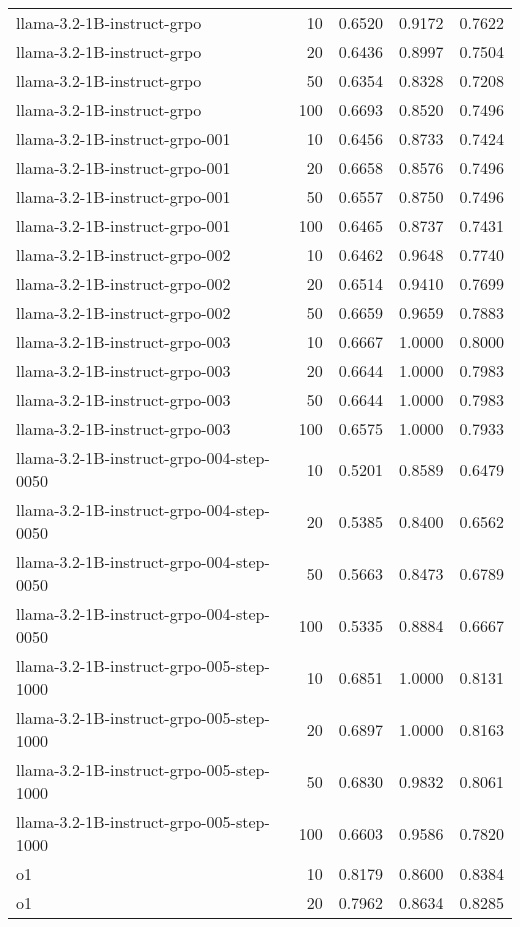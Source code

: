 \begin{tabular}{lrrrr}
llama-3.2-1B-instruct-grpo & 10 & 0.6520 & 0.9172 & 0.7622 \\
llama-3.2-1B-instruct-grpo & 20 & 0.6436 & 0.8997 & 0.7504 \\
llama-3.2-1B-instruct-grpo & 50 & 0.6354 & 0.8328 & 0.7208 \\
llama-3.2-1B-instruct-grpo & 100 & 0.6693 & 0.8520 & 0.7496 \\
llama-3.2-1B-instruct-grpo-001 & 10 & 0.6456 & 0.8733 & 0.7424 \\
llama-3.2-1B-instruct-grpo-001 & 20 & 0.6658 & 0.8576 & 0.7496 \\
llama-3.2-1B-instruct-grpo-001 & 50 & 0.6557 & 0.8750 & 0.7496 \\
llama-3.2-1B-instruct-grpo-001 & 100 & 0.6465 & 0.8737 & 0.7431 \\
llama-3.2-1B-instruct-grpo-002 & 10 & 0.6462 & 0.9648 & 0.7740 \\
llama-3.2-1B-instruct-grpo-002 & 20 & 0.6514 & 0.9410 & 0.7699 \\
llama-3.2-1B-instruct-grpo-002 & 50 & 0.6659 & 0.9659 & 0.7883 \\
llama-3.2-1B-instruct-grpo-003 & 10 & 0.6667 & 1.0000 & 0.8000 \\
llama-3.2-1B-instruct-grpo-003 & 20 & 0.6644 & 1.0000 & 0.7983 \\
llama-3.2-1B-instruct-grpo-003 & 50 & 0.6644 & 1.0000 & 0.7983 \\
llama-3.2-1B-instruct-grpo-003 & 100 & 0.6575 & 1.0000 & 0.7933 \\
llama-3.2-1B-instruct-grpo-004-step-0050 & 10 & 0.5201 & 0.8589 & 0.6479 \\
llama-3.2-1B-instruct-grpo-004-step-0050 & 20 & 0.5385 & 0.8400 & 0.6562 \\
llama-3.2-1B-instruct-grpo-004-step-0050 & 50 & 0.5663 & 0.8473 & 0.6789 \\
llama-3.2-1B-instruct-grpo-004-step-0050 & 100 & 0.5335 & 0.8884 & 0.6667 \\
llama-3.2-1B-instruct-grpo-005-step-1000 & 10 & 0.6851 & 1.0000 & 0.8131 \\
llama-3.2-1B-instruct-grpo-005-step-1000 & 20 & 0.6897 & 1.0000 & 0.8163 \\
llama-3.2-1B-instruct-grpo-005-step-1000 & 50 & 0.6830 & 0.9832 & 0.8061 \\
llama-3.2-1B-instruct-grpo-005-step-1000 & 100 & 0.6603 & 0.9586 & 0.7820 \\
o1 & 10 & 0.8179 & 0.8600 & 0.8384 \\
o1 & 20 & 0.7962 & 0.8634 & 0.8285 \\

\end{tabular}
